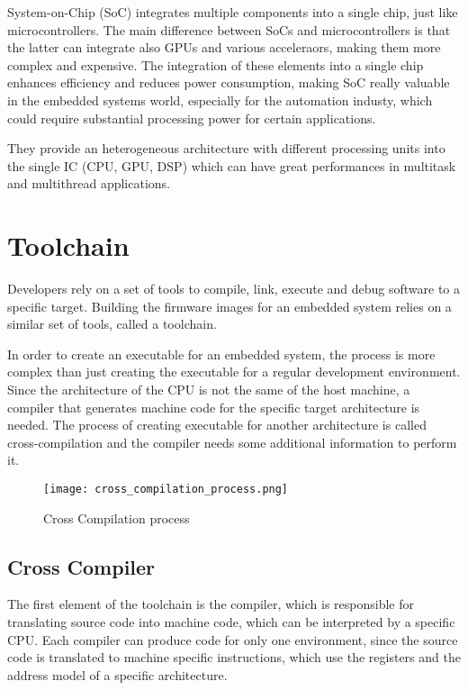 System-on-Chip (SoC) integrates multiple components into a single chip, just
like microcontrollers.
The main difference between SoCs and microcontrollers is that the latter can
integrate also GPUs and various acceleraors, making them more complex and
expensive.
The integration of these elements into a single chip enhances efficiency and
reduces power consumption, making SoC really valuable in the embedded systems
world, especially for the automation industy, which could require substantial
processing power for certain applications.

They provide an heterogeneous architecture with different processing units
into the single IC (CPU, GPU, DSP) which can have great performances in
multitask and multithread applications.

\section{Toolchain} 

Developers rely on a set of tools to compile, link, execute and debug software
to a specific target.
Building the firmware images for an embedded system relies on a similar set of
tools, called a toolchain.

In order to create an executable for an embedded system, the process is more
complex than just creating the executable for a regular development
environment.
Since the architecture of the CPU is not the same of the host machine, a
compiler that generates machine code for the specific target architecture is
needed.
The process of creating executable for another architecture is called
cross-compilation and the compiler needs some additional information
to perform it.

\begin{figure}[ht]
    \centering
    \texttt{[image: cross\_compilation\_process.png]}
    \caption{Cross Compilation process}
    \label{fig:cross_compilation}
\end{figure}

\subsection{Cross Compiler}

The first element of the toolchain is the compiler, which is responsible for
translating source code into machine code, which can be interpreted by a
specific CPU.
Each compiler can produce code for only one environment, since the source code
is translated to machine specific instructions, which use the registers and
the address model of a specific architecture.

